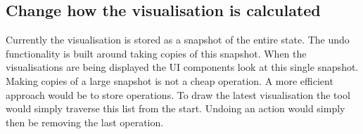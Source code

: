 

\subsection{Change how the visualisation is calculated}
Currently the visualisation is stored as a snapshot of the entire state.  The undo functionality is built around taking copies of this snapshot. When the visualisations are being displayed the \ac{UI} components look at this single snapshot.  Making copies of a large snapshot is not a cheap operation.  A more efficient approach would be to store operations.  To draw the latest visualisation the tool would simply traverse this list from the start.  Undoing an action would simply then be removing the last operation.
